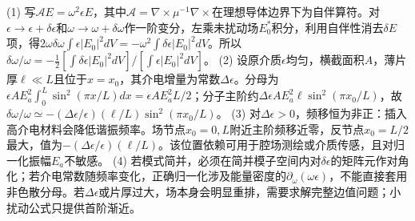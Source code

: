 (1) 写\(\mathcal A E=\omega^2\epsilon E\)，其中\(\mathcal A=\nabla\times\mu^{-1}\nabla\times\)在理想导体边界下为自伴算符。对\(\epsilon\to\epsilon+\delta\epsilon\)和\(\omega\to\omega+\delta\omega\)作一阶变分，左乘未扰动场\(E_0^*\)积分，利用自伴性消去\(\delta E\)项，得\(2\omega\delta\omega\int\epsilon|E_0|^2dV=-\omega^2\int\delta\epsilon|E_0|^2dV\)。所以\(\delta\omega/\omega=-\frac12[\int\delta\epsilon|E_0|^2dV]/[\int\epsilon|E_0|^2dV]\)。
(2) 设原介质\(\epsilon\)均匀，横截面积\(A\)，薄片厚\(\ell\ll L\)且位于\(x=x_0\)，其介电增量为常数\(\Delta\epsilon\)。分母为\(\epsilon A E_a^2\int_0^L\sin^2(\pi x/L)dx=\epsilon A E_a^2L/2\)；分子主阶约\(\Delta\epsilon A E_a^2\ell\sin^2(\pi x_0/L)\)，故\(\delta\omega/\omega\simeq-(\Delta\epsilon/\epsilon)(\ell/L)\sin^2(\pi x_0/L)\)。
(3) 对\(\Delta\epsilon>0\)，频移恒为非正：插入高介电材料会降低谐振频率。场节点\(x_0=0,L\)附近主阶频移近零，反节点\(x_0=L/2\)最大，值为\(-(\Delta\epsilon/\epsilon)(\ell/L)\)。该位置依赖可用于腔场测绘或介质传感，且对归一化振幅\(E_a\)不敏感。
(4) 若模式简并，必须在简并模子空间内对\(\delta\epsilon\)的矩阵元作对角化；若介电常数随频率变化，正确归一化涉及能量密度的\(\partial_\omega(\omega\epsilon)\)，不能直接套用非色散分母。若\(\Delta\epsilon\)或片厚过大，场本身会明显重排，需要求解完整边值问题；小扰动公式只提供首阶渐近。
